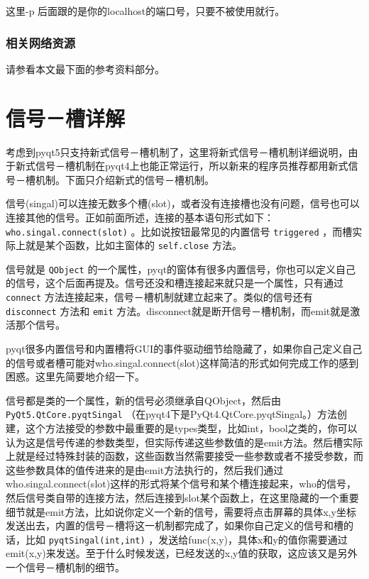 \documentclass[11pt,oneside]{article}
\begin{document}
这里-p 后面跟的是你的localhost的端口号，只要不被使用就行。


\subsubsection{相关网络资源}
\label{sec:orgheadline16}
请参看本文最下面的参考资料部分。



\section{信号－槽详解}
\label{sec:orgheadline23}
考虑到pyqt5只支持新式信号－槽机制了，这里将新式信号－槽机制详细说明，由于新式信号－槽机制在pyqt4上也能正常运行，所以新来的程序员推荐都用新式信号－槽机制。下面只介绍新式的信号－槽机制。

信号(singal)可以连接无数多个槽(slot)，或者没有连接槽也没有问题，信号也可以连接其他的信号。正如前面所述，连接的基本语句形式如下： \texttt{who.singal.connect(slot)} 。比如说按钮最常见的内置信号 \texttt{triggered} ，而槽实际上就是某个函数，比如主窗体的 \texttt{self.close} 方法。

信号就是 \texttt{QObject} 的一个属性，pyqt的窗体有很多内置信号，你也可以定义自己的信号，这个后面再提及。信号还没和槽连接起来就只是一个属性，只有通过 \texttt{connect} 方法连接起来，信号－槽机制就建立起来了。类似的信号还有 \texttt{disconnect} 方法和 \texttt{emit} 方法。disconnect就是断开信号－槽机制，而emit就是激活那个信号。

pyqt很多内置信号和内置槽将GUI的事件驱动细节给隐藏了，如果你自己定义自己的信号或者槽可能对who.singal.connect(slot)这样简洁的形式如何完成工作的感到困惑。这里先简要地介绍一下。

信号都是类的一个属性，新的信号必须继承自QObject，然后由 \texttt{PyQt5.QtCore.pyqtSingal} （在pyqt4下是PyQt4.QtCore.pyqtSingal。）方法创建，这个方法接受的参数中最重要的是types类型，比如int，bool之类的，你可以认为这是信号传递的参数类型，但实际传递这些参数值的是emit方法。然后槽实际上就是经过特殊封装的函数，这些函数当然需要接受一些参数或者不接受参数，而这些参数具体的值传进来的是由emit方法执行的，然后我们通过who.singal.connect(slot)这样的形式将某个信号和某个槽连接起来，who的信号，然后信号类自带的连接方法，然后连接到slot某个函数上，在这里隐藏的一个重要细节就是emit方法，比如说你定义一个新的信号，需要将点击屏幕的具体x,y坐标发送出去，内置的信号－槽将这一机制都完成了，如果你自己定义的信号和槽的话，比如 \texttt{pyqtSingal(int,int)} ，发送给func(x,y)，具体x和y的值你需要通过emit(x,y)来发送。至于什么时候发送，已经发送的x,y值的获取，这应该又是另外一个信号－槽机制的细节。
\end{document}
